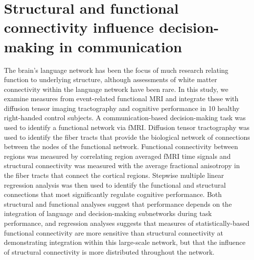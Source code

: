 \chapter{Structural and functional connectivity influence decision-making in communication}
\label{chap_homo}

The brain's language network has been the focus of much research relating function to underlying structure, although assessments of white matter connectivity within the language network have been rare. In this study, we examine measures from event-related functional MRI and integrate these with diffusion tensor imaging tractography and cognitive performance in 10 healthy right-handed control subjects. A communication-based decision-making task was used to identify a functional network via fMRI. Diffusion tensor tractography was used to identify the fiber tracts that provide the biological network of connections between the nodes of the functional network. Functional connectivity between regions was measured by correlating region averaged fMRI time signals and structural connectivity was measured with the average fractional anisotropy in the fiber tracts that connect the cortical regions. Stepwise multiple linear regression analysis was then used to identify the functional and structural connections that most significantly regulate cognitive performance. Both structural and functional analyses suggest that performance depends on the integration of language and decision-making subnetworks during task performance, and regression analyses suggests that measures of statistically-based functional connectivity are more sensitive than  structural connectivity at demonstrating integration within this large-scale network, but that the influence of structural connectivity is more distributed throughout the network.

